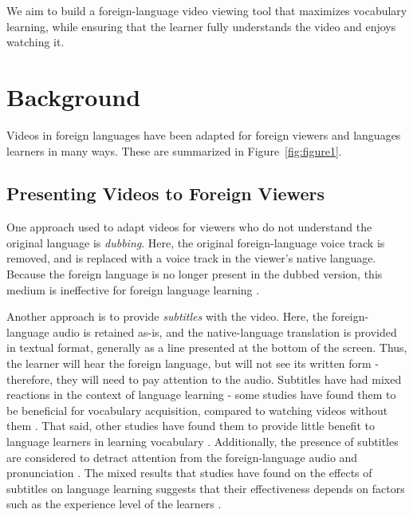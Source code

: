 \documentclass{sigchi}
\begin{document}
We aim to build a foreign-language video viewing tool
that maximizes vocabulary learning, while ensuring that the learner
fully understands the video and enjoys watching it.

\section{Background}

Videos in foreign languages have been adapted for foreign viewers and languages learners in many ways. These are summarized in Figure~\ref{fig:figure1}.

\subsection{Presenting Videos to Foreign Viewers}

One approach used to adapt videos for viewers who do not understand the original language is \emph{dubbing}. Here, the original foreign-language voice track is removed, and is replaced with a voice track in the viewer's native language.
Because the foreign language is no longer present in the dubbed version, this medium is ineffective for foreign language learning \cite{dubbing}.

Another approach is to provide \emph{subtitles} with the video. Here, the foreign-language audio is retained as-is, and the native-language translation is provided in textual format, generally as a line presented at the bottom of the screen.
Thus, the learner will hear the foreign language, but will not see its written form - therefore, they will need to pay attention to the audio.
Subtitles have had mixed reactions in the context of language learning - some studies have found them to be beneficial for vocabulary acquisition, compared to watching videos without them \cite{danan2004captioning}.
That said, other studies have found them to provide little benefit to language learners in learning vocabulary \cite{danan1992reversed}. Additionally, the presence of subtitles are considered to detract attention from the foreign-language audio and pronunciation \cite{mitterer2009foreign}.
The mixed results that studies have found on the effects of subtitles on language learning suggests that their effectiveness depends on factors such as the experience level of the learners \cite{bianchi2008captions}.
\end{document}
